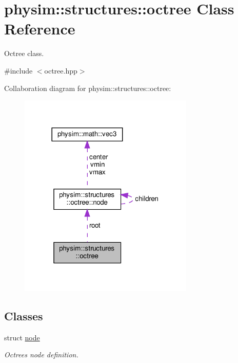 \hypertarget{classphysim_1_1structures_1_1octree}{}\section{physim\+:\+:structures\+:\+:octree Class Reference}
\label{classphysim_1_1structures_1_1octree}


Octree class.  




{\ttfamily \#include $<$octree.\+hpp$>$}



Collaboration diagram for physim\+:\+:structures\+:\+:octree\+:\nopagebreak
\begin{figure}[H]
\begin{center}
\leavevmode
\includegraphics[width=236pt]{classphysim_1_1structures_1_1octree__coll__graph}
\end{center}
\end{figure}
\subsection*{Classes}
\begin{DoxyCompactItemize}
\item 
struct \hyperlink{structphysim_1_1structures_1_1octree_1_1node}{node}
\begin{DoxyCompactList}\small\item\em Octree\textquotesingle{}s node definition. \end{DoxyCompactList}\end{DoxyCompactItemize}
